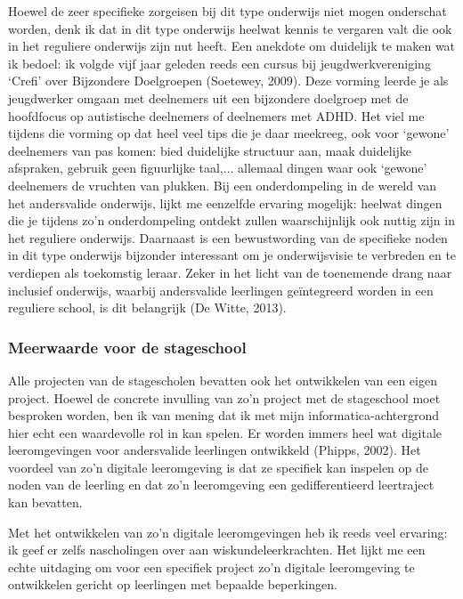 \documentclass[a4paper,11pt]{article}
\theoremstyle{definition}
\begin{document}
\noindent Hoewel de zeer specifieke zorgeisen bij dit type onderwijs niet mogen onderschat worden, denk 
ik dat in dit type onderwijs heelwat kennis te vergaren valt die ook in het reguliere onderwijs zijn nut heeft. Een anekdote om duidelijk te maken wat ik bedoel: ik volgde vijf jaar geleden reeds een cursus bij 
jeugdwerkvereniging `Crefi' over Bijzondere Doelgroepen (Soetewey, 2009).
Deze vorming leerde je als jeugdwerker omgaan met deelnemers uit een bijzondere 
doelgroep met de hoofdfocus op autistische deelnemers of deelnemers 
met ADHD. Het viel me tijdens die vorming op dat heel veel tips die je daar 
meekreeg, ook voor `gewone' deelnemers van pas komen: bied duidelijke structuur aan, 
maak duidelijke afspraken, gebruik geen figuurlijke taal,... allemaal dingen waar 
ook `gewone' deelnemers de vruchten van plukken. Bij een onderdompeling in de 
wereld van het andersvalide onderwijs, lijkt me eenzelfde ervaring mogelijk: 
heelwat dingen die je tijdens zo'n onderdompeling ontdekt zullen waarschijnlijk 
ook nuttig zijn in het reguliere onderwijs. Daarnaast is een bewustwording van 
de specifieke noden in dit type onderwijs bijzonder interessant om je 
onderwijsvisie te verbreden en te verdiepen als toekomstig leraar. Zeker in het licht van de toenemende
drang naar inclusief onderwijs, waarbij andersvalide leerlingen geïntegreerd worden in een reguliere
school, is dit belangrijk (De Witte, 2013).

\subsubsection{Meerwaarde voor de stageschool}
Alle projecten van de stagescholen bevatten ook het ontwikkelen van 
een eigen project. Hoewel de concrete invulling van zo'n project met de 
stageschool moet besproken worden, ben ik van mening dat ik met mijn 
informatica-achtergrond hier echt een waardevolle rol in kan spelen.  Er worden immers heel wat digitale leeromgevingen voor andersvalide leerlingen 
ontwikkeld (Phipps, 2002). Het voordeel van zo'n digitale leeromgeving is dat ze specifiek kan inspelen op 
de noden van de leerling en dat zo'n leeromgeving een gedifferentieerd 
leertraject kan bevatten. \\
\noindent 

Met het ontwikkelen van zo'n digitale leeromgevingen heb ik  
reeds veel ervaring: ik geef er zelfs nascholingen over aan wiskundeleerkrachten. 
Het lijkt me een echte uitdaging om voor een specifiek project zo'n digitale 
leeromgeving te ontwikkelen gericht op leerlingen met bepaalde beperkingen. 
\end{document}
